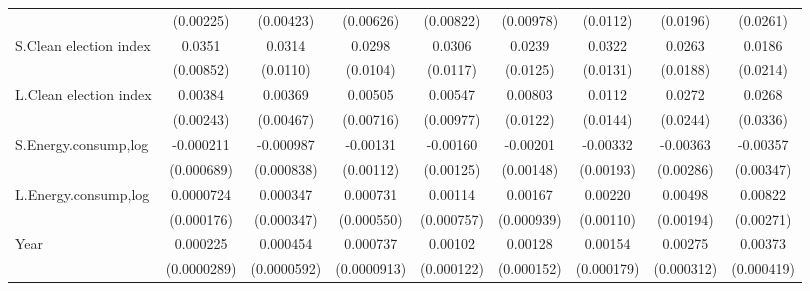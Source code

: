 \begin{table}[htbp]
\begin{tabular}{l*{8}{c}}
                    &   (0.00225)         &   (0.00423)         &   (0.00626)         &   (0.00822)         &   (0.00978)         &    (0.0112)         &    (0.0196)         &    (0.0261)         \\
[1em]
S.Clean election index&      0.0351\sym{***}&      0.0314\sym{***}&      0.0298\sym{***}&      0.0306\sym{***}&      0.0239\sym{*}  &      0.0322\sym{**} &      0.0263         &      0.0186         \\
                    &   (0.00852)         &    (0.0110)         &    (0.0104)         &    (0.0117)         &    (0.0125)         &    (0.0131)         &    (0.0188)         &    (0.0214)         \\
[1em]
L.Clean election index&     0.00384         &     0.00369         &     0.00505         &     0.00547         &     0.00803         &      0.0112         &      0.0272         &      0.0268         \\
                    &   (0.00243)         &   (0.00467)         &   (0.00716)         &   (0.00977)         &    (0.0122)         &    (0.0144)         &    (0.0244)         &    (0.0336)         \\
[1em]
S.Energy.consump,log&   -0.000211         &   -0.000987         &    -0.00131         &    -0.00160         &    -0.00201         &    -0.00332\sym{*}  &    -0.00363         &    -0.00357         \\
                    &  (0.000689)         &  (0.000838)         &   (0.00112)         &   (0.00125)         &   (0.00148)         &   (0.00193)         &   (0.00286)         &   (0.00347)         \\
[1em]
L.Energy.consump,log&   0.0000724         &    0.000347         &    0.000731         &     0.00114         &     0.00167\sym{*}  &     0.00220\sym{**} &     0.00498\sym{**} &     0.00822\sym{***}\\
                    &  (0.000176)         &  (0.000347)         &  (0.000550)         &  (0.000757)         &  (0.000939)         &   (0.00110)         &   (0.00194)         &   (0.00271)         \\
[1em]
Year                &    0.000225\sym{***}&    0.000454\sym{***}&    0.000737\sym{***}&     0.00102\sym{***}&     0.00128\sym{***}&     0.00154\sym{***}&     0.00275\sym{***}&     0.00373\sym{***}\\
                    & (0.0000289)         & (0.0000592)         & (0.0000913)         &  (0.000122)         &  (0.000152)         &  (0.000179)         &  (0.000312)         &  (0.000419)         \\

\end{tabular}
\end{table}
